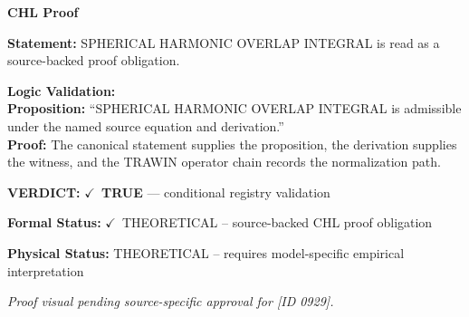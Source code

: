 \vspace{0.45em}
\noindent\textbf{CHL Proof}\par
\textbf{Statement:} SPHERICAL HARMONIC OVERLAP INTEGRAL is read as a source-backed proof obligation.

\textbf{Logic Validation:}\\
\textbf{Proposition:} ``SPHERICAL HARMONIC OVERLAP INTEGRAL is admissible under the named source equation and derivation.''\\
\textbf{Proof:} The canonical statement supplies the proposition, the derivation supplies the witness, and the TRAWIN operator chain records the normalization path.

\textbf{VERDICT:} \ensuremath{\checkmark}\ \textbf{TRUE} --- conditional registry validation

\textbf{Formal Status:} \ensuremath{\checkmark}\ THEORETICAL -- source-backed CHL proof obligation

\textbf{Physical Status:} THEORETICAL -- requires model-specific empirical interpretation
\par\vspace{0.45em}
\par
\vfill
\begingroup\footnotesize\itshape
Proof visual pending source-specific approval for [ID 0929].
\par\endgroup
\vfill
\endgroup
\endgroup
